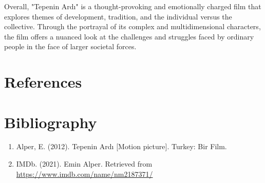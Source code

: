\documentclass[12pt]{article}
\begin{document}
Overall, "Tepenin Ardı" is a thought-provoking and emotionally charged film that explores themes of development, tradition, and the individual versus the collective. Through the portrayal of its complex and multidimensional characters, the film offers a nuanced look at the challenges and struggles faced by ordinary people in the face of larger societal forces.


\section{References}

\section*{Bibliography}
\begin{enumerate}
        \item Alper, E. (2012). Tepenin Ardı [Motion picture]. Turkey: Bir Film.
        \item IMDb. (2021). Emin Alper. Retrieved from \url{https://www.imdb.com/name/nm2187371/}
\end{enumerate}
\end{document}
